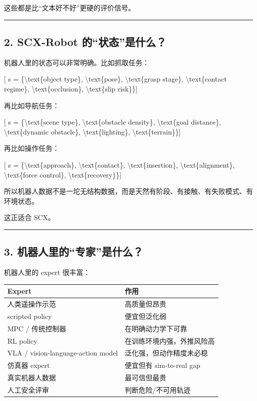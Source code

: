 \documentclass[
  12pt,
]{ctexart}
\begin{document}
这些都是比``文本好不好''更硬的评价信号。

\begin{center}\rule{0.5\linewidth}{0.5pt}\end{center}

\subsection{2. SCX-Robot
的``状态''是什么？}\label{scx-robot-ux7684ux72b6ux6001ux662fux4ec0ux4e48}

机器人里的状态可以非常明确。比如抓取任务：

{[} s = \{\textbackslash text\{object type\},
\textbackslash text\{pose\}, \textbackslash text\{grasp stage\},
\textbackslash text\{contact regime\}, \textbackslash text\{occlusion\},
\textbackslash text\{slip risk\}\}{]}

再比如导航任务：

{[} s = \{\textbackslash text\{scene type\},
\textbackslash text\{obstacle density\}, \textbackslash text\{goal
distance\}, \textbackslash text\{dynamic obstacle\},
\textbackslash text\{lighting\}, \textbackslash text\{terrain\}\}{]}

再比如操作任务：

{[} s = \{\textbackslash text\{approach\},
\textbackslash text\{contact\}, \textbackslash text\{insertion\},
\textbackslash text\{alignment\}, \textbackslash text\{force control\},
\textbackslash text\{recovery\}\}{]}

所以机器人数据不是一坨无结构数据，而是天然有阶段、有接触、有失败模式、有环境状态。

这正适合 SCX。

\begin{center}\rule{0.5\linewidth}{0.5pt}\end{center}

\subsection{3.
机器人里的``专家''是什么？}\label{ux673aux5668ux4ebaux91ccux7684ux4e13ux5bb6ux662fux4ec0ux4e48}

机器人里的 expert 很丰富：

\begin{longtable}[]{@{}ll@{}}
\toprule\noalign{}
Expert & 作用 \\
\midrule\noalign{}
\endhead
\bottomrule\noalign{}
\endlastfoot
人类遥操作示范 & 高质量但昂贵 \\
scripted policy & 便宜但泛化弱 \\
MPC / 传统控制器 & 在明确动力学下可靠 \\
RL policy & 在训练环境内强，外推风险高 \\
VLA / vision-language-action model & 泛化强，但动作精度未必稳 \\
仿真器 expert & 便宜但有 sim-to-real gap \\
真实机器人数据 & 最可信但最贵 \\
人工安全评审 & 判断危险/不可用轨迹 \\
\end{longtable}
\end{document}
